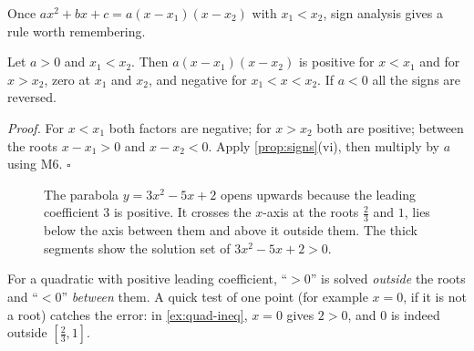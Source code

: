 Once $ax^2+bx+c=a(x-x_1)(x-x_2)$ with $x_1<x_2$, sign analysis gives a rule worth remembering.

\begin{proposition}
Let $a>0$ and $x_1<x_2$. Then $a(x-x_1)(x-x_2)$ is positive for $x<x_1$ and for $x>x_2$, zero at $x_1$ and $x_2$,
and negative for $x_1<x<x_2$. If $a<0$ all the signs are reversed.
\end{proposition}
\emph{Proof.} For $x<x_1$ both factors are negative; for $x>x_2$ both are positive; between the roots
$x-x_1>0$ and $x-x_2<0$. Apply \cref{prop:signs}(vi), then multiply by $a$ using M6. \hfill$\square$

\begin{figure}[ht]
\centering
{}
\caption{The parabola $y=3x^2-5x+2$ opens upwards because the leading coefficient $3$ is positive. It crosses the
$x$-axis at the roots $\tfrac23$ and $1$, lies below the axis between them and above it outside them. The thick
segments show the solution set of $3x^2-5x+2>0$.}
\label{fig:parabola}
\end{figure}

\begin{warning}
For a quadratic with positive leading coefficient, ``$>0$'' is solved \emph{outside} the roots and ``$<0$''
\emph{between} them. A quick test of one point (for example $x=0$, if it is not a root) catches the error: in
\cref{ex:quad-ineq}, $x=0$ gives $2>0$, and $0$ is indeed outside $[\tfrac23,1]$.
\end{warning}

